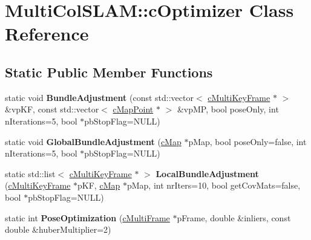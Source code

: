 \hypertarget{classMultiColSLAM_1_1cOptimizer}{}\section{Multi\+Col\+S\+L\+AM\+:\+:c\+Optimizer Class Reference}
\label{classMultiColSLAM_1_1cOptimizer}
\subsection*{Static Public Member Functions}
\begin{DoxyCompactItemize}
\item 
static void {\bfseries Bundle\+Adjustment} (const std\+::vector$<$ \hyperlink{classMultiColSLAM_1_1cMultiKeyFrame}{c\+Multi\+Key\+Frame} $\ast$ $>$ \&vp\+KF, const std\+::vector$<$ \hyperlink{classMultiColSLAM_1_1cMapPoint}{c\+Map\+Point} $\ast$ $>$ \&vp\+MP, bool pose\+Only, int n\+Iterations=5, bool $\ast$pb\+Stop\+Flag=N\+U\+LL)\hypertarget{classMultiColSLAM_1_1cOptimizer_ac36a5a15e6976776dffbf02251fb6314}{}\label{classMultiColSLAM_1_1cOptimizer_ac36a5a15e6976776dffbf02251fb6314}

\item 
static void {\bfseries Global\+Bundle\+Adjustment} (\hyperlink{classMultiColSLAM_1_1cMap}{c\+Map} $\ast$p\+Map, bool pose\+Only=false, int n\+Iterations=5, bool $\ast$pb\+Stop\+Flag=N\+U\+LL)\hypertarget{classMultiColSLAM_1_1cOptimizer_a2cfb2425d60d80fa23e7a38a370840d3}{}\label{classMultiColSLAM_1_1cOptimizer_a2cfb2425d60d80fa23e7a38a370840d3}

\item 
static std\+::list$<$ \hyperlink{classMultiColSLAM_1_1cMultiKeyFrame}{c\+Multi\+Key\+Frame} $\ast$ $>$ {\bfseries Local\+Bundle\+Adjustment} (\hyperlink{classMultiColSLAM_1_1cMultiKeyFrame}{c\+Multi\+Key\+Frame} $\ast$p\+KF, \hyperlink{classMultiColSLAM_1_1cMap}{c\+Map} $\ast$p\+Map, int nr\+Iters=10, bool get\+Cov\+Mats=false, bool $\ast$pb\+Stop\+Flag=N\+U\+LL)\hypertarget{classMultiColSLAM_1_1cOptimizer_ab9d0a69c33c68b087b4acbaf883b6728}{}\label{classMultiColSLAM_1_1cOptimizer_ab9d0a69c33c68b087b4acbaf883b6728}

\item 
static int {\bfseries Pose\+Optimization} (\hyperlink{classMultiColSLAM_1_1cMultiFrame}{c\+Multi\+Frame} $\ast$p\+Frame, double \&inliers, const double \&huber\+Multiplier=2)\hypertarget{classMultiColSLAM_1_1cOptimizer_a84b4f65e120c8bb608a0be69cfbf6467}{}\label{classMultiColSLAM_1_1cOptimizer_a84b4f65e120c8bb608a0be69cfbf6467}


\end{DoxyCompactItemize}

